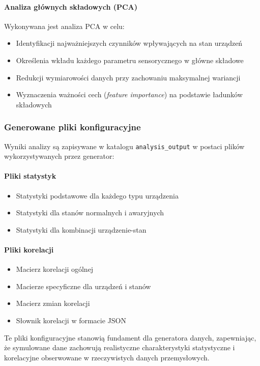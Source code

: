 \paragraph{Analiza głównych składowych (PCA)}
Wykonywana jest analiza PCA w celu:
\begin{itemize}
    \item Identyfikacji najważniejszych czynników wpływających na stan urządzeń
    \item Określenia wkładu każdego parametru sensorycznego w główne składowe
    \item Redukcji wymiarowości danych przy zachowaniu maksymalnej wariancji
    \item Wyznaczenia ważności cech (\textit{feature importance}) na podstawie ładunków składowych
\end{itemize}

\subsubsection{Generowane pliki konfiguracyjne}

Wyniki analizy są zapisywane w katalogu \texttt{analysis\_output} w postaci plików wykorzystywanych przez generator:

\paragraph{Pliki statystyk}
\begin{itemize}
    \item Statystyki podstawowe dla każdego typu urządzenia
    \item Statystyki dla stanów normalnych i awaryjnych
    \item Statystyki dla kombinacji urządzenie-stan
\end{itemize}

\paragraph{Pliki korelacji}
\begin{itemize}
    \item Macierz korelacji ogólnej
    \item Macierze specyficzne dla urządzeń i stanów
    \item Macierz zmian korelacji
    \item Słownik korelacji w formacie JSON
\end{itemize}

Te pliki konfiguracyjne stanowią fundament dla generatora danych, zapewniając, że symulowane dane zachowują realistyczne charakterystyki statystyczne i korelacyjne obserwowane w rzeczywistych danych przemysłowych.


